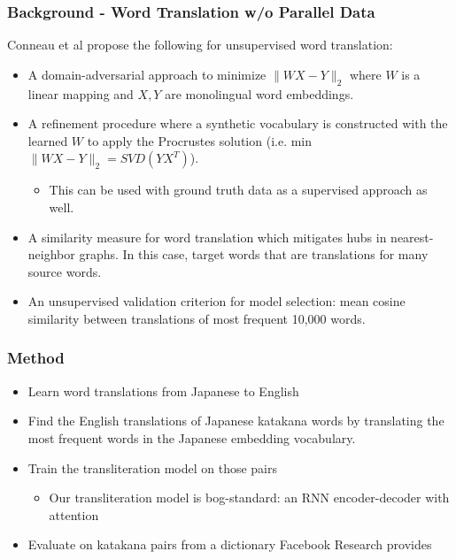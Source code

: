 \documentclass{beamer}
\begin{document}
\begin{frame}
  \frametitle{Background - Word Translation w/o Parallel Data}
  Conneau et al propose the following for unsupervised word translation:
  \begin{itemize}
    \item A domain-adversarial approach to minimize $\|WX-Y\|_2$ where $W$ is
      a linear mapping and $X,Y$ are monolingual word embeddings.
    \item A refinement procedure where a synthetic vocabulary is constructed
      with the learned $W$ to apply the Procrustes solution (i.e.
      min $\|WX-Y\|_2 = SVD(YX^T)$).
      \begin{itemize}
        \item This can be used with ground truth data as a supervised
          approach as well.
      \end{itemize}
    \item A similarity measure for word translation which mitigates hubs in
      nearest-neighbor graphs. In this case, target words that are translations
      for many source words.
    \item An unsupervised validation criterion for model selection: mean
      cosine similarity between translations of most frequent 10,000 words.
  \end{itemize}

\end{frame}

\begin{frame}
  \frametitle{Method}
  \begin{itemize}
  \item Learn word translations from Japanese to English
  \item Find the English translations of Japanese katakana words by translating
    the most frequent words in the Japanese embedding vocabulary.
  \item Train the transliteration model on those pairs
    \begin{itemize}
    \item Our transliteration model is bog-standard: an RNN encoder-decoder with
      attention
    \end{itemize}
  \item Evaluate on katakana pairs from a dictionary Facebook Research provides
  \end{itemize}
\end{frame}
\end{document}
